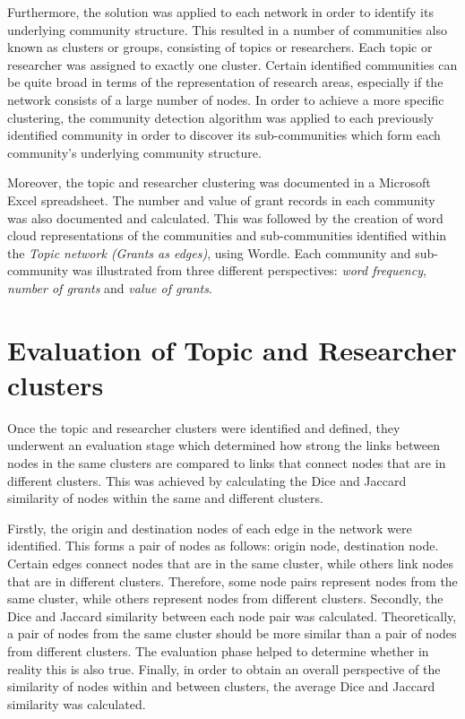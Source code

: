 Furthermore, the solution was applied to each network in order to identify its underlying community structure. This resulted in a number of communities also known as clusters or groups, consisting of topics or researchers. Each topic or researcher was assigned to exactly one cluster. Certain identified communities can be quite broad in terms of the representation of research areas, especially if the network consists of a large number of nodes. In order to achieve a more specific clustering, the community detection algorithm was applied to each previously identified community in order to discover its sub-communities which form each community's underlying community structure.

Moreover, the topic and researcher clustering was documented in a Microsoft Excel spreadsheet. The number and value of grant records in each community was also documented and calculated. This was followed by the creation of word cloud representations of the communities and sub-communities identified within the \textit{Topic network (Grants as edges)}, using Wordle. Each community and sub-community was illustrated from three different perspectives: \textit{word frequency}, \textit{number of grants} and \textit{value of grants}.

\section{Evaluation of Topic and Researcher clusters}

Once the topic and researcher clusters were identified and defined, they underwent an evaluation stage which determined how strong the links between nodes in the same clusters are compared to links that connect nodes that are in different clusters. This was achieved by calculating the Dice and Jaccard similarity of nodes within the same and different clusters.

Firstly, the origin and destination nodes of each edge in the network were identified. This forms a pair of nodes as follows: origin node, destination node. Certain edges connect nodes that are in the same cluster, while others link nodes that are in different clusters. Therefore, some node pairs represent nodes from the same cluster, while others represent nodes from different clusters. Secondly, the Dice and Jaccard similarity between each node pair was calculated. Theoretically, a pair of nodes from the same cluster should be more similar than a pair of nodes from different clusters. The evaluation phase helped to determine whether in reality this is also true. Finally, in order to obtain an overall perspective of the similarity of nodes within and between clusters, the average Dice and Jaccard similarity was calculated.

